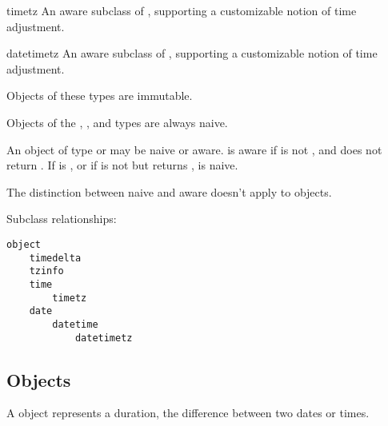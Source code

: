 \begin{classdesc*}{timetz}
  An aware subclass of , supporting a customizable notion of
  time adjustment.
\end{classdesc*}

\begin{classdesc*}{datetimetz}
  An aware subclass of , supporting a customizable notion of
  time adjustment.
\end{classdesc*}

Objects of these types are immutable.

Objects of the , , and  types
are always naive.

An object  of type  or  may be
naive or aware.   is aware if  is not
, and  does not return
.  If  is , or if
 is not  but
 returns , 
is naive.

The distinction between naive and aware doesn't apply to
 objects.

Subclass relationships:

\begin{verbatim}
object
    timedelta
    tzinfo
    time
        timetz
    date
        datetime
            datetimetz
\end{verbatim}

\subsection{ Objects \label{datetime-timedelta}}

A  object represents a duration, the difference
between two dates or times.


